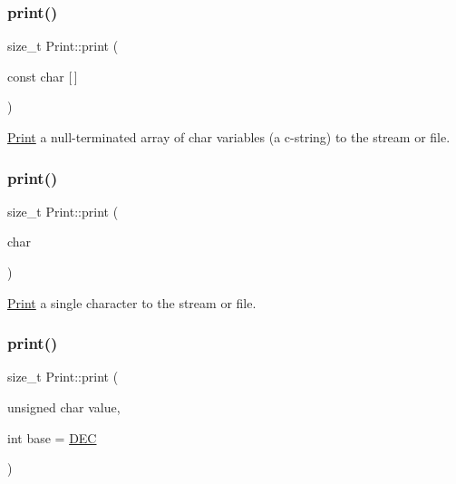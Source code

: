 \mbox{\label{class_print_acfe80773011eb17dfb52c2fba517a093}} 
\subsubsection{\texorpdfstring{print()}{print()}\hspace{0.1cm}{\footnotesize\ttfamily [10/19]}}
{\footnotesize\ttfamily size\+\_\+t Print\+::print (\begin{DoxyParamCaption}\item[{const char}]{\mbox{[}$\,$\mbox{]} }\end{DoxyParamCaption})}



\hyperlink{class_print}{Print} a null-\/terminated array of char variables (a c-\/string) to the stream or file. 

\mbox{\label{class_print_a1e411d07a8ffec5faf7ce485bac0f029}} 
\subsubsection{\texorpdfstring{print()}{print()}\hspace{0.1cm}{\footnotesize\ttfamily [11/19]}}
{\footnotesize\ttfamily size\+\_\+t Print\+::print (\begin{DoxyParamCaption}\item[{char}]{ }\end{DoxyParamCaption})}



\hyperlink{class_print}{Print} a single character to the stream or file. 

\mbox{\label{class_print_ae35481e77567618140cd58d8b96d3747}} 
\subsubsection{\texorpdfstring{print()}{print()}\hspace{0.1cm}{\footnotesize\ttfamily [12/19]}}
{\footnotesize\ttfamily size\+\_\+t Print\+::print (\begin{DoxyParamCaption}\item[{unsigned char}]{value,  }\item[{int}]{base = {\ttfamily \hyperlink{docs_2src_2spark__wiring__print_8h_a26e216c38cffa0a9965fa7933ba558b1}{D\+EC}} }\end{DoxyParamCaption})}



